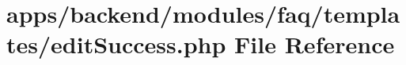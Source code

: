 \hypertarget{backend_2modules_2faq_2templates_2edit_success_8php}{\section{apps/backend/modules/faq/templates/edit\-Success.php File Reference}
\label{backend_2modules_2faq_2templates_2edit_success_8php}
}
